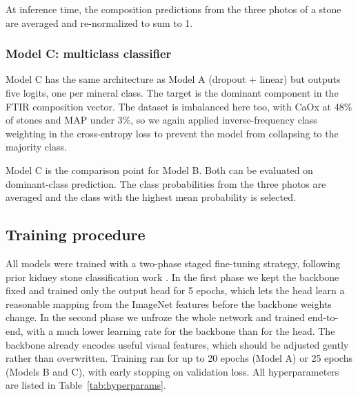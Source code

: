 \documentclass[10pt,twocolumn]{article}
\begin{document}
At inference time, the composition predictions from the three photos of a stone are averaged and re-normalized to sum to 1.

\subsubsection*{Model C: multiclass classifier}

Model C has the same architecture as Model A (dropout + linear) but outputs five logits, one per mineral class. The target is the dominant component in the FTIR composition vector. The dataset is imbalanced here too, with CaOx at 48\% of stones and MAP under 3\%, so we again applied inverse-frequency class weighting in the cross-entropy loss to prevent the model from collapsing to the majority class.

Model C is the comparison point for Model B. Both can be evaluated on dominant-class prediction. The class probabilities from the three photos are averaged and the class with the highest mean probability is selected.

\subsection*{Training procedure}

All models were trained with a two-phase staged fine-tuning strategy, following prior kidney stone classification work \cite{LopezTiro2024, veltheer2025}. In the first phase we kept the backbone fixed and trained only the output head for 5 epochs, which lets the head learn a reasonable mapping from the ImageNet features before the backbone weights change. In the second phase we unfroze the whole network and trained end-to-end, with a much lower learning rate for the backbone than for the head. The backbone already encodes useful visual features, which should be adjusted gently rather than overwritten. Training ran for up to 20 epochs (Model A) or 25 epochs (Models B and C), with early stopping on validation loss. All hyperparameters are listed in Table~\ref{tab:hyperparams}.
\end{document}
